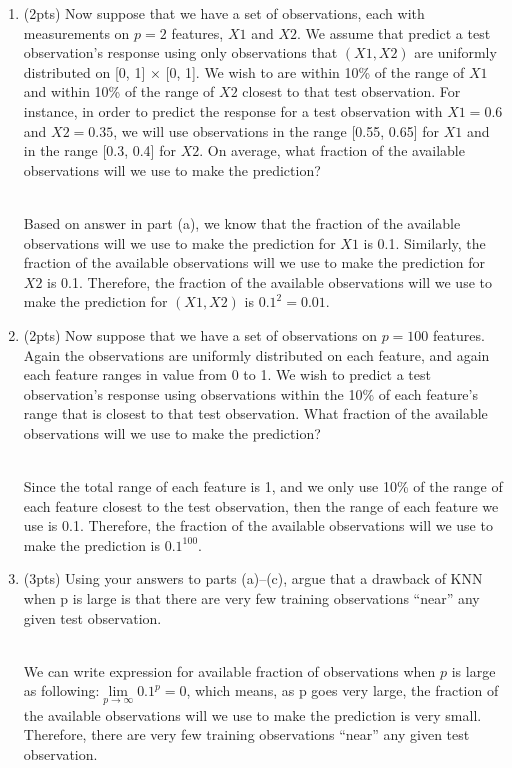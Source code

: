 \documentclass[a4paper]{article}
\theoremstyle{definition}
\newenvironment{soln}{
    \leavevmode\color{blue}\ignorespaces
}{}
\begin{document}
\begin{enumerate}
\begin{enumerate}
	
	\item (2pts) Now suppose that we have a set of observations, each with measurements on $p =2$ features, $X1$ and $X2$. We assume that predict a test observation’s response using only observations that $(X1,X2)$ are uniformly distributed on [0, 1] × [0, 1]. We wish to are within 10\% of the range of $X1$ and within 10\% of the range of $X2$ closest to that test observation. For instance, in order to predict the response for a test observation with $X1 =0.6$ and $X2 =0.35$, we will use observations in the range [0.55, 0.65] for $X1$ and in the range [0.3, 0.4] for $X2$. On average, what fraction of the available observations will we use to make the prediction?
	
	\begin{soln}\\
	Based on answer in part (a), we know that the fraction of the available observations will we use to make the prediction for $X1$ is 0.1. Similarly, the fraction of the available observations will we use to make the prediction for $X2$ is 0.1. Therefore, the fraction of the available observations will we use to make the prediction for $(X1,X2)$ is $0.1^2 = 0.01$.
	\end{soln}
	
	\item (2pts) Now suppose that we have a set of observations on $p = 100$ features. Again the observations are uniformly distributed on each feature, and again each feature ranges in value from 0 to 1. We wish to predict a test observation’s response using observations within the 10\% of each feature’s range that is closest to that test observation. What fraction of the available observations will we use to make the prediction?
	
	\begin{soln}\\
	Since the total range of each feature is 1, and we only use 10\% of the range of each feature closest to the test observation, then the range of each feature we use is 0.1. Therefore, the fraction of the available observations will we use to make the prediction is $0.1^{100}$.
	\end{soln}
	
	\item (3pts) Using your answers to parts (a)–(c), argue that a drawback of KNN when p is large is that there are very few training observations “near” any given test observation.
	
	\begin{soln}\\
	We can write expression for available fraction of observations when $p$ is large as following:$\underset{p \to \infty}{\lim} 0.1^p = 0$, which means, as p goes very large, the fraction of the available observations will we use to make the prediction is very small. Therefore, there are very few training observations “near” any given test observation.
	\end{soln}
	

\end{enumerate}
\end{enumerate}
\end{document}
